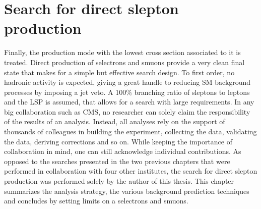 \chapter{Search for direct slepton\\ production}\label{sec:slepton}
\noindent\justify
Finally, the production mode with the lowest cross section associated to it is treated. 
Direct production of selectrons and smuons provide a very clean final state that makes for a simple but effective search design. 
To first order, no hadronic activity is expected, giving a great handle to reducing SM background processes by imposing a jet veto. 
A 100\% branching ratio of sleptons to leptons and the \firstchi LSP is assumed, that allows for a search with large \ptmiss requirements. 
\newpara
\noindent\justify
In any big collaboration such as CMS, no researcher can solely claim the responsibility of the results of an analysis. 
Instead, all analyses rely on the support of thousands of colleagues in building the experiment, collecting the data, validating the data, deriving corrections and so on. 
While keeping the importance of collaboration in mind, one can still acknowledge individual contributions. 
As opposed to the searches presented in the two previous chapters that were performed in collaboration with four other institutes, the search for direct slepton production was performed solely by the author of this thesis.
\newpara
\noindent\justify
This chapter summarizes the analysis strategy, the various background prediction techniques and concludes by setting limits on a selectrons and smuons. 
\newpage
